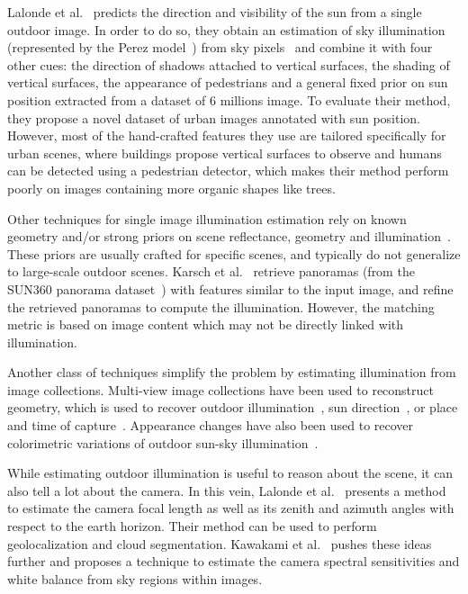 Lalonde et al.~\cite{lalonde-ijcv-12} predicts the direction and visibility of the sun from a single outdoor image. In order to do so, they obtain an estimation of sky illumination (represented by the Perez model~\cite{perez1993allweather}) from sky pixels~\cite{lalonde-ijcv-10} and combine it with four other cues: the direction of shadows attached to vertical surfaces, the shading of vertical surfaces, the appearance of pedestrians and a general fixed prior on sun position extracted from a dataset of 6 millions image. To evaluate their method, they propose a novel dataset of urban images annotated with sun position. However, most of the hand-crafted features they use are tailored specifically for urban scenes, where buildings propose vertical surfaces to observe and humans can be detected using a pedestrian detector, which makes their method perform poorly on images containing more organic shapes like trees. 

Other techniques for single image illumination estimation rely on known geometry and/or strong priors on scene reflectance, geometry and illumination~\cite{barron-pami-15,barron2013rgbd,lombardi2016reflectance}. These priors are usually crafted for specific scenes, and typically do not generalize to large-scale outdoor scenes. Karsch et al.~\cite{karsch2014automatic} retrieve panoramas (from the SUN360 panorama dataset~\cite{xiao-cvpr-12}) with features similar to the input image, and refine the retrieved panoramas to compute the illumination. However, the matching metric is based on image content which may not be directly linked with illumination. 

Another class of techniques simplify the problem by estimating illumination from image collections. Multi-view image collections have been used to reconstruct geometry, which is used to recover outdoor illumination~\cite{haber2009relighting,lalonde-3dv-14,shan2015visual,duchene2015multiview}, sun direction~\cite{wehrwein2015shadows}, or place and time of capture~\cite{hauagge2014outdoor}. Appearance changes have also been used to recover colorimetric variations of outdoor sun-sky illumination~\cite{sunkavalli2008color}. 

While estimating outdoor illumination is useful to reason about the scene, it can also tell a lot about the camera. In this vein, Lalonde et al.~\cite{lalonde-ijcv-10} presents a method to estimate the camera focal length as well as its zenith and azimuth angles with respect to the earth horizon. Their method can be used to perform geolocalization and cloud segmentation. Kawakami et al.~\cite{kawakami2013camera} pushes these ideas further and proposes a technique to estimate the camera spectral sensitivities and white balance from sky regions within images. 


